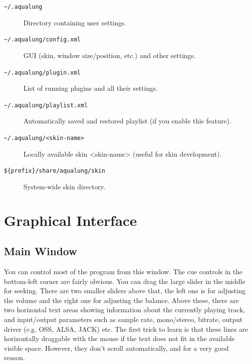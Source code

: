 \documentclass[10pt,english]{article}
\begin{document}
\begin{description}

\item [
\texttt{\textasciitilde{}/.aqualung}
]

Directory containing user settings.

\item [
\texttt{\textasciitilde{}/.aqualung/config.xml}
]

GUI (skin, window size/position, etc.) and other
settings.

\item [
\texttt{\textasciitilde{}/.aqualung/plugin.xml}
]

List of running plugins and all their settings.

\item [
\texttt{\textasciitilde{}/.aqualung/playlist.xml}
]

Automatically saved and restored playlist (if you enable
this feature).

\item [
\texttt{\textasciitilde{}/.aqualung/<skin-name>}
]

Locally available skin <skin-name> (useful for
skin development).

\item [
\texttt{\$\{prefix\}/share/aqualung/skin}
]

System-wide skin directory.

\end{description}





\section{Graphical Interface\label{idp466848}}

\subsection{Main Window\label{idp467376}}



\noindent You can control most of the program from this window. The
cue controls in the bottom-left corner are fairly obvious. You
can drag the large slider in the middle for seeking. There are
two smaller sliders above that, the left one is for adjusting
the volume and the right one for adjusting the balance. Above
these, there are two horizontal text areas showing information
about the currently playing track, and input/output parameters
such as sample rate, mono/stereo, bitrate, output driver
(e.g. OSS, ALSA, JACK) etc. The first trick to learn is that
these lines are horizontally draggable with the mouse if the
text does not fit in the available visible space. However,
they don't scroll automatically, and for a very good reason.
\end{document}
